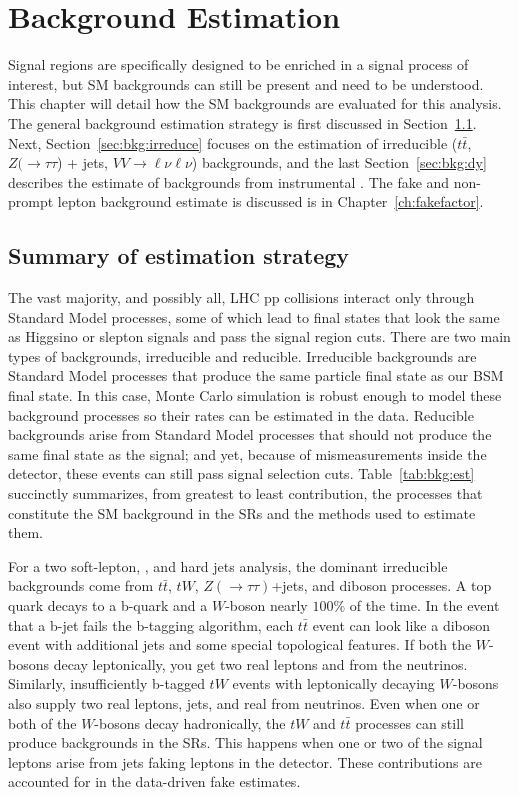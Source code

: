 \chapter{Background Estimation}
\label{ch:bkg}
Signal regions are specifically designed to be enriched in a signal process of interest, but SM backgrounds can still be present and need to be understood.  This chapter will detail how the SM backgrounds are evaluated for this analysis.  The general background estimation strategy is first discussed in Section~\ref{sec:bkg:summary}.  Next, Section~\ref{sec:bkg:irreduce} focuses on the estimation of irreducible ($t\bar{t}$, $Z(\rightarrow\tau\tau$) + jets, $VV\rightarrow\ell\nu\ell\nu$) backgrounds, and the last Section~\ref{sec:bkg:dy} describes the estimate of backgrounds from instrumental \met. The fake and non-prompt lepton background estimate is discussed is in Chapter~\ref{ch:fakefactor}.

\section{Summary of estimation strategy}
\label{sec:bkg:summary}
The vast majority, and possibly all, LHC pp collisions interact only through Standard Model processes, some of which lead to final states that look the same as Higgsino or slepton signals and pass the signal region cuts.  There are two main types of backgrounds, irreducible and reducible. Irreducible backgrounds are Standard Model processes that produce the same particle final state as our BSM final state.  In this case, Monte Carlo simulation is robust enough to model these background processes so their rates can be estimated in the data.  Reducible backgrounds arise from Standard Model processes that should not produce the same final state as the signal; and yet, because of mismeasurements inside the detector, these events can still pass signal selection cuts.  Table~\ref{tab:bkg:est} succinctly summarizes, from greatest to least contribution, the processes that constitute the SM background in the SRs and the methods used to estimate them. 

For a two soft-lepton, \met{}, and hard jets analysis, the dominant irreducible backgrounds come from $t\bar{t}$, $tW$, $Z(\rightarrow\tau\tau)$+jets, and diboson processes.  A top quark decays to a b-quark and a $W$-boson nearly $100\%$ of the time.  In the event that a b-jet fails the b-tagging algorithm, each $t\bar{t}$ event can look like a diboson event with additional jets and some special topological features.  If both the $W$-bosons decay leptonically, you get two real leptons and \met from the neutrinos.  Similarly, insufficiently b-tagged $tW$ events with leptonically decaying $W$-bosons also supply two real leptons, jets, and real \met from neutrinos.  Even when one or both of the $W$-bosons decay hadronically, the $tW$ and $t\bar{t}$ processes can still produce backgrounds in the SRs.  This happens when one or two of the signal leptons arise from jets faking leptons in the detector.  These contributions are accounted for in the data-driven fake estimates.  

